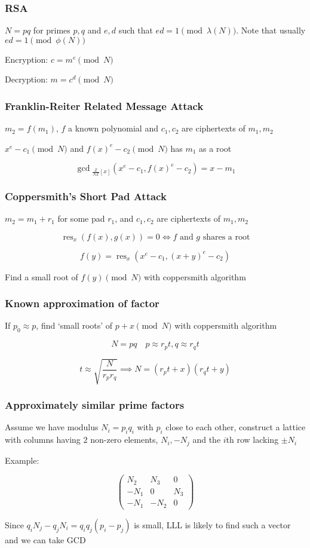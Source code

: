 \documentclass{beamer}
\begin{document}
\begin{frame}
    \frametitle{RSA}
    $N=pq$ for primes $p,q$ and $e,d$ such that $ed=1\pmod{\lambda(N)}$. Note that usually $ed=1\pmod{\phi(N)}$

    Encryption: $c=m^e\pmod N$
    
    Decryption: $m=c^d\pmod N$
\end{frame}

\begin{frame}
    \frametitle{Franklin-Reiter Related Message Attack}
    $m_2=f(m_1)$, $f$ a known polynomial and $c_1,c_2$ are ciphertexts of $m_1,m_2$

    $x^e-c_1\pmod N$ and $f(x)^e-c_2\pmod N$ has $m_1$ as a root\pause

    $$\gcd\!_{\frac{\mathbb Z}{N\mathbb Z}[x]}\left(x^e-c_1,f(x)^e-c_2\right)=x-m_1$$
\end{frame}

\begin{frame}
    \frametitle{Coppersmith's Short Pad Attack}
    $m_2=m_1+r_1$ for some pad $r_1$, and $c_1,c_2$ are ciphertexts of $m_1,m_2$\pause
    
    $$\operatorname{res}_x(f(x),g(x))=0\iff f\text{ and }g\text{ shares a root}$$\pause

    $$f(y)=\operatorname{res}_x\left(x^e-c_1,(x+y)^e-c_2\right)$$

    Find a small root of $f(y)\pmod N$ with coppersmith algorithm
\end{frame}

\begin{frame}
    \frametitle{Known approximation of factor}
    If $p_0\approx p$, find `small roots' of $p+x\pmod N$ with coppersmith algorithm\pause

    $$N=pq\quad p\approx r_pt,q\approx r_qt$$
    
    $$t\approx\sqrt{\frac N{r_pr_q}}\implies N=\left(r_pt+x\right)\left(r_qt+y\right)$$
\end{frame}

\begin{frame}
    \frametitle{Approximately similar prime factors}
    Assume we have modulus $N_i=p_iq_i$ with $p_i$ close to each other, construct a lattice with columns having $2$ non-zero elements, $N_i,-N_j$ and the $i$th row lacking $\pm N_i$

    Example:

    $$\begin{pmatrix}
        N_{2} & N_{3} & 0 \\
        -N_{1} & 0 & N_{3} \\
        -N_{1} & -N_{2} & 0
    \end{pmatrix}$$

    Since $q_iN_j-q_jN_i=q_iq_j\left(p_i-p_j\right)$ is small, LLL is likely to find such a vector and we can take GCD
\end{frame}
\end{document}
